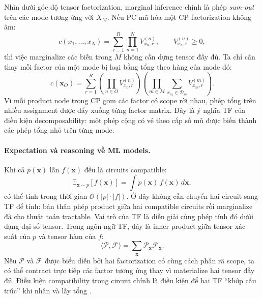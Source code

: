 Nhìn dưới góc độ tensor factorization, marginal inference chính là phép \emph{sum-out}
trên các mode tương ứng với $X_M$.  Nếu PC mã hóa một CP factorization không âm:
\begin{equation}
    c(x_1,\ldots,x_N)
    =
    \sum_{r=1}^{R}\prod_{n=1}^{N}V^{(n)}_{x_n,r},
    \qquad V^{(n)}_{x_n,r}\ge 0,
    \label{eq:nn-cp-query}
\end{equation}
thì việc marginalize các biến trong $M$ không cần dựng tensor đầy đủ.  Ta chỉ cần
thay mỗi factor của một mode bị loại bằng tổng theo hàng của mode đó:
\begin{equation}
    c(\mathbf{x}_O)
    =
    \sum_{r=1}^{R}
    \left(\prod_{n\in O}V^{(n)}_{x_n,r}\right)
    \left(\prod_{m\in M}\sum_{x_m\in\mathcal{D}_m}V^{(m)}_{x_m,r}\right).
    \label{eq:cp-marginal-query}
\end{equation}
Vì mỗi product node trong CP gom các factor có scope rời nhau, phép tổng trên nhiều
assignment được đẩy xuống từng factor matrix.  Đây là ý nghĩa TF của điều kiện
decomposability: một phép cộng có vẻ theo cấp số mũ được biến thành các phép tổng nhỏ
trên từng mode.

\paragraph{Expectation và reasoning về ML models.}
Khi cả $p(\mathbf{x})$ lẫn $f(\mathbf{x})$ đều là circuits compatible:
\begin{equation}
    \mathbb{E}_{\mathbf{x} \sim p}[f(\mathbf{x})]
    = \int p(\mathbf{x})\, f(\mathbf{x})\, d\mathbf{x},
    \label{eq:expectation}
\end{equation}
có thể tính trong thời gian $\mathcal{O}(|p| \cdot |f|)$.
Ở đây không cần chuyển hai circuit sang TF để tính: bản thân phép product giữa hai
compatible circuits rồi marginalize đã cho thuật toán tractable.  Vai trò của TF là
diễn giải cùng phép tính đó dưới dạng đại số tensor.  Trong ngôn ngữ TF, đây là inner
product giữa tensor xác suất của $p$ và tensor hàm
của $f$:
\begin{equation}
    \langle \mathcal{P}, \mathcal{F}\rangle
    =
    \sum_{\mathbf{x}}\mathcal{P}_{\mathbf{x}}\mathcal{F}_{\mathbf{x}}.
\end{equation}
Nếu $\mathcal{P}$ và $\mathcal{F}$ được biểu diễn bởi hai factorization có cùng cách
phân rã scope, ta có thể contract trực tiếp các factor tương ứng thay vì materialize hai
tensor đầy đủ.  Điều kiện compatibility trong circuit chính là điều kiện để hai TF
``khớp cấu trúc'' khi nhân và lấy tổng \cite{loconte2025relationship,
vergari2021compositional}.

